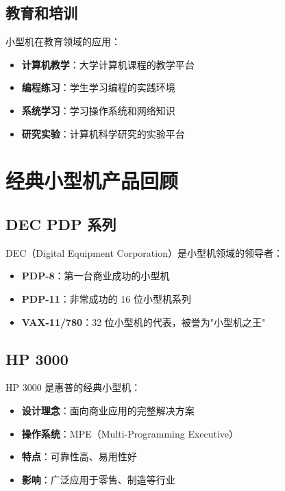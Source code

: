 \documentclass[12pt,UTF8]{ctexbook}
\begin{document}
\section{教育和培训}

小型机在教育领域的应用：

\begin{itemize}[leftmargin=2cm]
    \item \textbf{计算机教学}：大学计算机课程的教学平台
    \item \textbf{编程练习}：学生学习编程的实践环境
    \item \textbf{系统学习}：学习操作系统和网络知识
    \item \textbf{研究实验}：计算机科学研究的实验平台
\end{itemize}

\chapter{经典小型机产品回顾}
\label{chap:classic_products}

\section{DEC PDP 系列}

DEC（Digital Equipment Corporation）是小型机领域的领导者：

\begin{itemize}[leftmargin=2cm]
    \item \textbf{PDP-8}：第一台商业成功的小型机
    \item \textbf{PDP-11}：非常成功的 16 位小型机系列
    \item \textbf{VAX-11/780}：32 位小型机的代表，被誉为"小型机之王"
\end{itemize}

\section{HP 3000}

HP 3000 是惠普的经典小型机：

\begin{itemize}[leftmargin=2cm]
    \item \textbf{设计理念}：面向商业应用的完整解决方案
    \item \textbf{操作系统}：MPE（Multi-Programming Executive）
    \item \textbf{特点}：可靠性高、易用性好
    \item \textbf{影响}：广泛应用于零售、制造等行业
\end{itemize}
\end{document}
